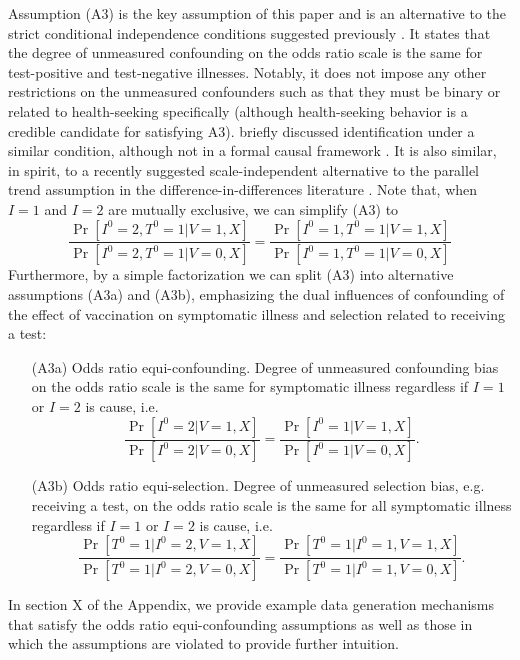 \documentclass[11pt]{article}
\begin{document}
Assumption (A3) is the key assumption of this paper and is an alternative to the strict conditional independence conditions suggested previously \cite{schnitzer_estimands_2022}. It states that the degree of unmeasured confounding on the odds ratio scale is the same for test-positive and test-negative illnesses. Notably, it does not impose any other restrictions on the unmeasured confounders such as that they must be binary or related to health-seeking specifically (although health-seeking behavior is a credible candidate for satisfying A3). \citeauthor{lewnard_measurement_2018} briefly discussed identification under a similar condition, although not in a formal causal framework \cite{lewnard_measurement_2018}. It is also similar, in spirit, to a recently suggested  scale-independent alternative to the parallel trend assumption in the difference-in-differences literature \cite{park_universal_2023,tchetgen_universal_2023}. Note that, when $I = 1$ and $I = 2$ are mutually exclusive, we can simplify (A3) to
\begin{equation}
    \frac{\Pr[I^0 = 2, T^0 = 1 | V = 1, X]}{\Pr[I^0 = 2, T^0 = 1 | V = 0, X]} =\frac{\Pr[I^0 = 1, T^0 = 1 | V = 1, X]}{\Pr[I^0 = 1, T^0 = 1 | V = 0, X]}
\end{equation}
Furthermore, by a simple factorization we can split (A3) into alternative assumptions (A3a) and (A3b), emphasizing the dual influences of confounding of the effect of vaccination on symptomatic illness and selection related to receiving a test:
\begin{itemize}
    \item[(A3a)] Odds ratio equi-confounding. Degree of unmeasured confounding bias on the odds ratio scale is the same for symptomatic illness regardless if $I=1$ or $I=2$ is cause, i.e. 
    $$\frac{\Pr[I^0 = 2 | V = 1, X]}{\Pr[I^0 = 2 | V = 0, X]} =\frac{\Pr[I^0 = 1 | V = 1, X]}{\Pr[I^0 = 1 | V = 0, X]}.$$
    \item[(A3b)] Odds ratio equi-selection. Degree of unmeasured selection bias, e.g. receiving a test, on the odds ratio scale is the same for all symptomatic illness regardless if $I=1$ or $I=2$ is cause, i.e. 
    $$\frac{\Pr[T^0 = 1 | I^0 = 2, V = 1, X]}{\Pr[T^0 = 1 | I^0 = 2, V = 0, X]} =\frac{\Pr[T^0 = 1 | I^0 = 1, V = 1, X]}{\Pr[T^0 = 1 | I^0 = 1, V = 0, X]}.$$
\end{itemize}
In section X of the Appendix, we provide example data generation mechanisms that satisfy the odds ratio equi-confounding assumptions as well as those in which the assumptions are violated to provide further intuition.
\end{document}
